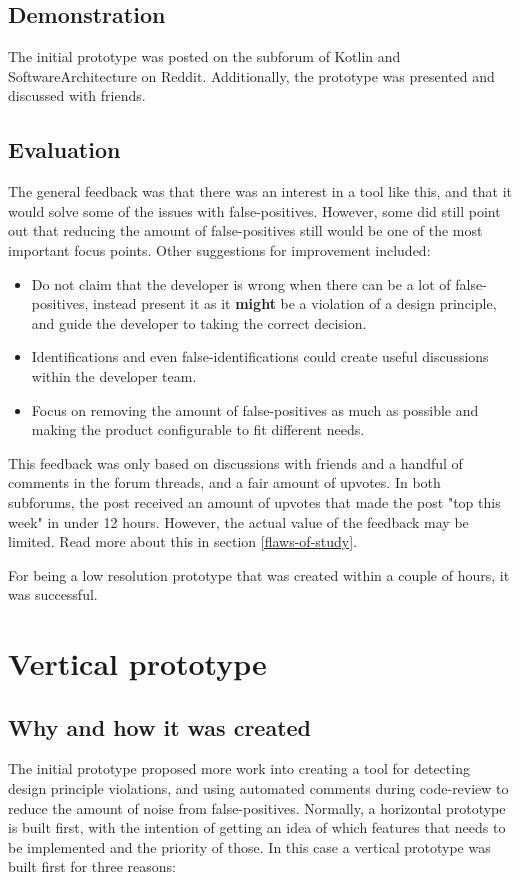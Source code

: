 \documentclass{report}
\begin{document}
\subsection*{Demonstration}
The initial prototype was posted on the subforum of Kotlin\cite{kotlin-reddit} and SoftwareArchitecture\cite{softwarearch-reddit} on Reddit. Additionally, the prototype was presented and discussed with friends. 

\subsection*{Evaluation}

The general feedback was that there was an interest in a tool like this, and that it would solve some of the issues with false-positives. However, some did still point out that reducing the amount of false-positives still would be one of the most important focus points. Other suggestions for improvement included: 
\begin{itemize}
    \item Do not claim that the developer is wrong when there can be a lot of false-positives, instead present it as it \textbf{might} be a violation of a design principle, and guide the developer to taking the correct decision.
    \item Identifications and even false-identifications could create useful discussions within the developer team.
    \item Focus on removing the amount of false-positives as much as possible and making the product configurable to fit different needs.
\end{itemize}

This feedback was only based on discussions with friends and a handful of comments in the forum threads, and a fair amount of upvotes. In both subforums, the post received an amount of upvotes that made the post "top this week" in under 12 hours. However, the actual value of the feedback may be limited. Read more about this in section \ref{flaws-of-study}. 

For being a low resolution prototype that was created within a couple of hours, it was successful.


\section{Vertical prototype}

\subsection*{Why and how it was created}
The initial prototype proposed more work into creating a tool for detecting design principle violations, and using automated comments during code-review to reduce the amount of noise from false-positives. Normally, a horizontal prototype is built first, with the intention of getting an idea of which features that needs to be implemented and the priority of those. In this case a vertical prototype was built first for three reasons:
\end{document}
